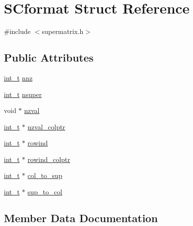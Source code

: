 \hypertarget{structSCformat}{}\section{S\+Cformat Struct Reference}
\label{structSCformat}


{\ttfamily \#include $<$supermatrix.\+h$>$}

\subsection*{Public Attributes}
\begin{DoxyCompactItemize}
\item 
\hyperlink{slu__cdefs_8h_ab6fd6105e64ed14a0c9281326f05e623}{int\+\_\+t} \hyperlink{structSCformat_a3808f35bd097fbc0a39e3e65ee2a8d4a}{nnz}
\item 
\hyperlink{slu__cdefs_8h_ab6fd6105e64ed14a0c9281326f05e623}{int\+\_\+t} \hyperlink{structSCformat_aafffc008b0b8e57b9cdf5689a527bd8c}{nsuper}
\item 
void $\ast$ \hyperlink{structSCformat_a25011a4746e4cf0a6fbc38ba45a70e91}{nzval}
\item 
\hyperlink{slu__cdefs_8h_ab6fd6105e64ed14a0c9281326f05e623}{int\+\_\+t} $\ast$ \hyperlink{structSCformat_a41e93b73c8bce9326f035e3647ee94ca}{nzval\+\_\+colptr}
\item 
\hyperlink{slu__cdefs_8h_ab6fd6105e64ed14a0c9281326f05e623}{int\+\_\+t} $\ast$ \hyperlink{structSCformat_aec8a46751f64a94238495838aaed7cd2}{rowind}
\item 
\hyperlink{slu__cdefs_8h_ab6fd6105e64ed14a0c9281326f05e623}{int\+\_\+t} $\ast$ \hyperlink{structSCformat_a7683b1730b067ae2058004f0f18ad88d}{rowind\+\_\+colptr}
\item 
\hyperlink{slu__cdefs_8h_ab6fd6105e64ed14a0c9281326f05e623}{int\+\_\+t} $\ast$ \hyperlink{structSCformat_a75a51eef4af5a906cde9a32eddcb2fc1}{col\+\_\+to\+\_\+sup}
\item 
\hyperlink{slu__cdefs_8h_ab6fd6105e64ed14a0c9281326f05e623}{int\+\_\+t} $\ast$ \hyperlink{structSCformat_ad5cb1b2ae17c5fe554c3b70721718b08}{sup\+\_\+to\+\_\+col}
\end{DoxyCompactItemize}


\subsection{Member Data Documentation}
\hypertarget{structSCformat_a75a51eef4af5a906cde9a32eddcb2fc1}{}
